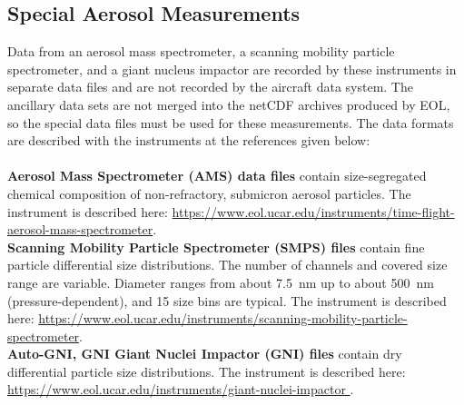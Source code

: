 \subsection{Special Aerosol Measurements}
\begin{hangparagraphs}
Data from an aerosol mass spectrometer,
a scanning mobility particle spectrometer, and a giant
nucleus impactor are recorded by these
instruments in separate data files and are not recorded by the aircraft
data system. The ancillary data
sets are not merged into the netCDF archives produced by EOL, so the
special data files must be used for these measurements. The data formats
are described with the instruments at the references given below:\\
\\
\textbf{Aerosol Mass Spectrometer (AMS) data files} contain size-segregated
chemical composition of non-refractory, submicron aerosol particles.
The instrument is described here: \href{https://www.eol.ucar.edu/instruments/time-flight-aerosol-mass-spectrometer}{https://www.eol.ucar.edu/instruments/time-flight-aerosol-mass-spectrometer}.\\
\textbf{Scanning Mobility Particle Spectrometer (SMPS) files} contain
fine particle differential size distributions. The number of channels
and covered size range are variable. Diameter ranges from about 7.5~nm
up to about 500~nm (pressure-dependent), and 15 size bins are typical.
The instrument is described here: \href{https://www.eol.ucar.edu/instruments/scanning-mobility-particle-spectrometer}{https://www.eol.ucar.edu/instruments/scanning-mobility-particle-spectrometer}.\\
\textbf{Auto-GNI, GNI Giant Nuclei Impactor (GNI) files} contain dry
differential particle size distributions. The instrument is described
here: \href{https://www.eol.ucar.edu/instruments/giant-nuclei-impactor }{https://www.eol.ucar.edu/instruments/giant-nuclei-impactor }.
\end{hangparagraphs}



